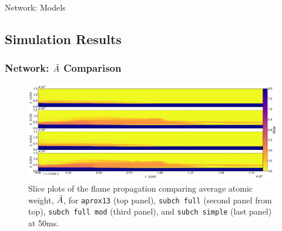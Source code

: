 \documentclass[
	11pt, %
]{beamer}
\begin{document}
\begin{frame}{Network: Models}
    
    \begin{table}
        \caption{This table shows the various settings used for each simulation.}
    \end{table}
    
\end{frame}

\subsection{Simulation Results}

\begin{frame}
\frametitle{Network: $\Bar{A}$ Comparison}
    \begin{figure}
        \centering
        \includegraphics[width=1\linewidth]{network_abar_50ms.pdf}
        \caption{\scriptsize Slice plots of the flame propagation comparing average atomic weight, $\Bar{A}$, for {\tt aprox13} (top panel), {\tt subch full} (second panel from top), {\tt subch full mod} (third panel), and {\tt subch simple} (last panel) at 50ms.}
    \end{figure}
\end{frame}
\end{document}
